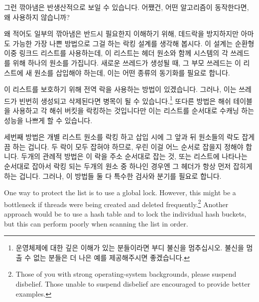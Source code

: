 그런 깎아냄은 반생산적으로 보일 수 있습니다.
어쨌건, 어떤 알고리즘이 동작한다면, 왜 사용하지 않습니까?

왜 적어도 일부의 깎아냄은 반드시 필요한지 이해하기 위해, 데드락을 방지하지만
아마도 가능한 가장 나쁜 방법으로 그걸 하는 락킹 설계를 생각해 봅시다.
이 설계는 순환형 이중 링크드 리스트를 사용하는데, 이 리스트는 헤더 원소와 함께
시스템의 각 쓰레드를 위해 하나의 원소를 가집니다.
새로운 쓰레드가 생성될 때, 그 부모 쓰레드는 이 리스트에 새 원소를 삽입해야
하는데, 이는 어떤 종류의 동기화를 필요로 합니다.

이 리스트를 보호하기 위해 전역 락을 사용하는 방법이 있겠습니다.
그러나, 이는 쓰레드가 빈번히 생성되고 삭제된다면 병목이 될 수
있습니다.\footnote{
	운영체제에 대한 깊은 이해가 있는 분들이라면 부디 불신을 멈추십시오.
	불신을 멈출 수 없는 분들은 더 나은 예를 제공해주시면 좋겠습니다.}
또다른 방법은 해쉬 테이블을 사용하고 각 해쉬 버킷을 락킹하는 것입니다만 이는
리스트를 순서대로 수캐닝 하는 성능을 나쁘게 할 수 있습니다.

세번째 방법은 개별 리스트 원소를 락킹 하고 삽입 시에 그 앞과 뒤 원소들의 락도
잡게끔 하는 겁니다.
두 락이 모두 잡혀야 하므로, 우린 이걸 어느 순서로 잡을지 정해야 합니다.
두개의 관례적 방법은 이 락을 주소 순서대로 잡는 것, 또는 리스트에 나타나는
순서대로 잡아서 락킹 되는 두개의 원소 중 하나인 경우엔 그 헤더가 항상 먼저
잡히게 하는 겁니다.
그러나, 이 방법들 둘 다 특수한 검사와 분기를 필요로 합니다.

\iffalse

One way to protect the list is to use a global lock.
However, this might be a bottleneck if threads were being created and
deleted frequently.\footnote{
	Those of you with strong operating-system backgrounds, please
	suspend disbelief.
	Those unable to suspend disbelief are encouraged to provide
	better examples.}
Another approach would be to use a hash table and to lock the individual
hash buckets, but this can perform poorly when scanning the list in order.


